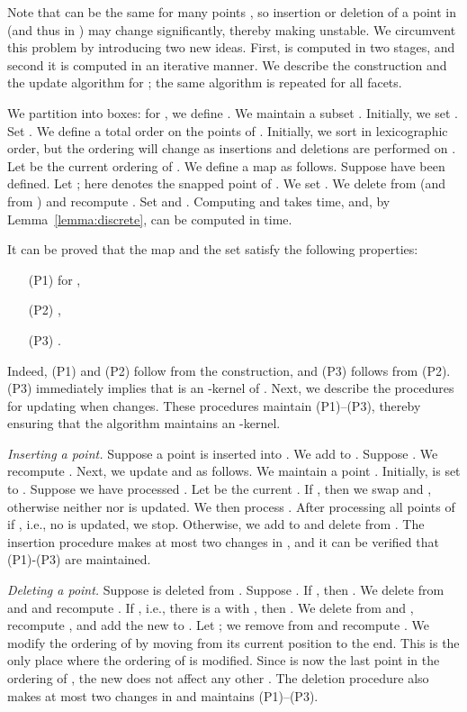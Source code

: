 \documentclass[11pt]{myclass}
\begin{document}
Note that  can be the same for many points , so 
insertion or deletion of a point in  (and thus in ) may change
 significantly, thereby making  unstable. We circumvent this problem by introducing two new ideas. First,  is computed 
in two 
stages, and second it is computed in an iterative manner. We describe the 
construction and the update algorithm for ; the same algorithm is repeated
for all facets. 

We partition  into  boxes: for 
, 
we define
. We maintain a subset
. Initially, we set . Set .
We define a total order on the points of . Initially, we
sort  in lexicographic order, but the ordering will change as 
insertions and deletions are performed on .
Let  be the current ordering of . We 
define a map  as follows. Suppose
 have been defined. Let 
; here 
 denotes the snapped point of . We set
. We delete  from  (and 
from ) and recompute . Set  and .
Computing  and  takes 
 time, and, by Lemma~\ref{lemma:discrete}, 
 can be computed in  time.

It can be proved that the map  and the set  satisfy the following properties:
\begin{itemize} \denselist
\item[(P1)]  for ,
\item[(P2)] ,
\item[(P3)] .
\end{itemize}
Indeed, (P1) and (P2) follow from the construction, and (P3) follows from
(P2). (P3) immediately implies that  is an -kernel of .
Next, we describe the procedures for updating  when 
changes.  These procedures maintain (P1)--(P3), 
thereby ensuring that the algorithm maintains an -kernel. 

\textit{Inserting a point.} 
Suppose a point  is inserted into . 
We add  to . Suppose . We recompute . Next, we update  and 
 as  follows. We maintain a point . Initially, 
 is set to .  Suppose we have processed 
. Let  be the 
current . If , then we 
swap  and , otherwise neither  nor  is updated.
We then process .  After processing all points of  if , 
i.e., no  is updated, we stop. Otherwise, we add  to  and 
delete  from . 
The insertion procedure makes at most two changes in , and it can be 
verified that (P1)-(P3) are maintained.

\textit{Deleting a point.} 
Suppose  is deleted from .  Suppose . 
If , then . 
We delete  from  and  and recompute . 
If , i.e., there is a  with , then .
We delete  from  and , recompute , and 
add the new  to .  Let ; we remove  from  and recompute .
We modify the ordering of  by moving  from its current position to the end. This is the only place where the ordering of  is modified. 
Since  is now the last point in the ordering of , the new  does not affect any other . 
The deletion procedure also makes at most two changes in  and maintains (P1)--(P3).  
\end{document}
